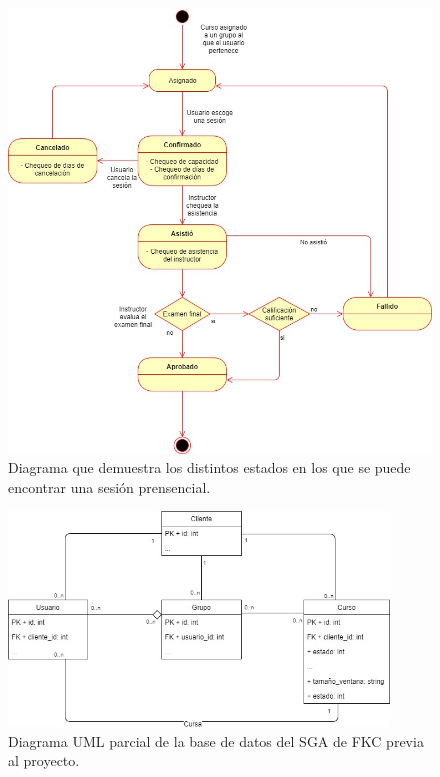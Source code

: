 \begin{figure}[t]
	\begin{center}
		\includegraphics[width=\textwidth]{figuras/diagramaEstadosSesion.jpg}
		\caption{Diagrama que demuestra los distintos estados en los que se puede encontrar una sesión prensencial.} \label{fig:diagramaEstadosSesion}
	\end{center}
\end{figure}

\begin{figure}[t]
	\begin{center}
		\includegraphics[width=0.9\textwidth]{figuras/databasePrevia.jpg}
		\caption{Diagrama UML parcial de la base de datos del SGA de FKC previa al proyecto.} \label{fig:baseDeDatosPrevia}
	\end{center}
\end{figure}

